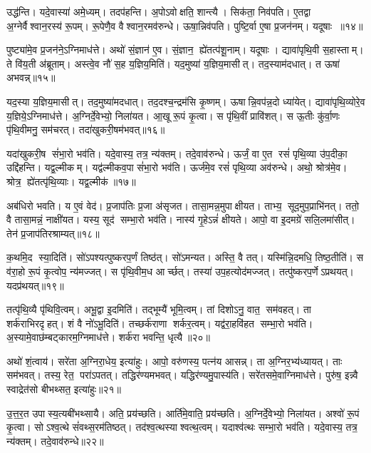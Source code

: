 उद्ध॑न्ति। यदे॒वास्या॑ अमे॒ध्यम्। तदप॑हन्ति। अ॒पोऽवोक्षति॒ शान्त्यै। सिक॑ता॒ निव॑पति। ए॒तद्वा अ॒ग्नेर्वैश्वान॒रस्य॑ रू॒पम्। रू॒पेणै॒व वैश्वान॒रमव॑रुन्धे। ऊषा॒न्निव॑पति। पुष्टि॒र्वा ए॒षा प्र॒जन॑नम्। यदूषाः ॥१४॥

पुष्ट्या॑मे॒व प्र॒जन॑ने॒ऽग्निमाध॑त्ते। अथो॑ सं॒ज्ञान॑ ए॒व। सं॒ज्ञान॒ ह्ये॑तत्प॑शू॒नाम्। यदूषाः। द्यावा॑पृथि॒वी स॒हास्ताम्। ते वि॑य॒ती अ॑ब्रूताम्। अस्त्वे॒व नौ॑ स॒ह य॒ज्ञिय॒मिति॑। यद॒मुष्या॑ य॒ज्ञिय॒मासीत्। तद॒स्याम॑दधात्। त ऊषा॑ अभवन्न्॥१५॥

यद॒स्या य॒ज्ञिय॒मासीत्। तद॒मुष्या॑मदधात्। तद॒दश्च॒न्द्रम॑सि कृ॒ष्णम्। ऊषान्नि॒वप॑न्न॒दो ध्या॑येत्। द्यावा॑पृथि॒व्योरे॒व य॒ज्ञिये॒ऽग्निमाध॑त्ते। अ॒ग्निर्दे॒वेभ्यो॒ निला॑यत। आ॒खू रू॒पं कृ॒त्वा। स पृ॑थि॒वीं प्रावि॑शत्। स ऊ॒तीः कु॑र्वा॒णः पृ॑थि॒वीमनु॒ सम॑चरत्। तदा॑खुकरी॒षम॑भवत्॥१६॥

यदा॑खुकरी॒ष सं॑भा॒रो भव॑ति। यदे॒वास्य॒ तत्र॒ न्य॑क्तम्। तदे॒वाव॑रुन्धे। ऊर्जं॒ वा ए॒त रसं॑ पृथि॒व्या उ॑प॒दीका॒ उद्दि॑हन्ति। यद्व॒ल्मीकम्। यद्व॑ल्मीकव॒पा सं॑भा॒रो भव॑ति। ऊर्ज॑मे॒व रसं॑ पृथि॒व्या अव॑रुन्धे। अथो॒ श्रोत्र॑मे॒व। श्रोत्र॒ ह्ये॑तत्पृ॑थि॒व्याः। यद्व॒ल्मीक॑॥१७॥

अब॑धिरो भवति। य ए॒वं वेद॑। प्र॒जाप॑तिः प्र॒जा अ॑सृजत। तासा॒मन्न॒मुपाक्षीयत। ताभ्य॒ सूद॒मुप॒प्राभि॑नत्। ततो॒ वै तासा॒मन्नं॒ नाक्षी॑यत। यस्य॒ सूद॑ सम्भा॒रो भव॑ति। नास्य॑ गृ॒हेऽन्नं॑ क्षीयते। आपो॒ वा इ॒दमग्रे॑ सलि॒लमा॑सीत्। तेन॑ प्र॒जाप॑तिरश्राम्यत्॥१८॥

क॒थमि॒द स्या॒दिति॑। सो॑ऽपश्यत्पुष्करप॒र्णं तिष्ठ॑त्। सो॑ऽमन्यत। अस्ति॒ वै तत्। यस्मि॑न्नि॒दमधि॒ तिष्ठ॒तीति॑। स व॑रा॒हो रू॒पं कृ॒त्वोप॒ न्य॑मज्जत्। स पृ॑थि॒वीम॒ध आर्च्छत्। तस्या॑ उप॒हत्योद॑मज्जत्। तत्पु॑ष्करप॒र्णेऽप्रथयत्। यदप्र॑थयत्॥१९॥

तत्पृ॑थि॒व्यै पृ॑थिवि॒त्वम्। अभू॒द्वा इ॒दमिति॑। तद्भूम्यै॑ भूमि॒त्वम्। तां दिशोऽनु॒ वात॒ सम॑वहत्। ता शर्क॑राभिरदृहत्। शं वै नो॑ऽभू॒दिति॑। तच्छर्क॑राणा शर्कर॒त्वम्। यद्व॑रा॒हवि॑हत सम्भा॒रो भव॑ति। अ॒स्यामे॒वाछ॑म्बट्कारम॒ग्निमाध॑त्ते। शर्क॑रा भवन्ति॒ धृत्यै॥२०॥

अथो॑ शं॒त्वाय॑। सरे॑ता अ॒ग्निरा॒धेय॒ इत्या॑हुः। आपो॒ वरु॑णस्य॒ पत्न॑य आसन्न्। ता अ॒ग्निर॒भ्य॑ध्यायत्। ताः सम॑भवत्। तस्य॒ रेत॒ परा॑ऽपतत्। तद्धिर॑ण्यमभवत्। यद्धिर॑ण्यमु॒पास्य॑ति। सरे॑तसमे॒वाग्निमाध॑त्ते। पुरु॑ष॒ इन्न्वै स्वाद्रेत॑सो बीभथ्सत॒ इत्या॑हुः॥२१॥

उ॒त्त॒र॒त उपास्य॒त्यबी॑भथ्सायै। अति॒ प्रय॑च्छति। आर्ति॑मे॒वाति॒ प्रय॑च्छति। अ॒ग्निर्दे॒वेभ्यो॒ निला॑यत। अश्वो॑ रू॒पं कृ॒त्वा। सोऽश्व॒त्थे सं॑वथ्स॒रम॑तिष्ठत्। तद॑श्व॒त्थस्याश्वत्थ॒त्वम्। यदाश्व॑त्थः सम्भा॒रो भव॑ति। यदे॒वास्य॒ तत्र॒ न्य॑क्तम्। तदे॒वाव॑रुन्धे॥२२॥

